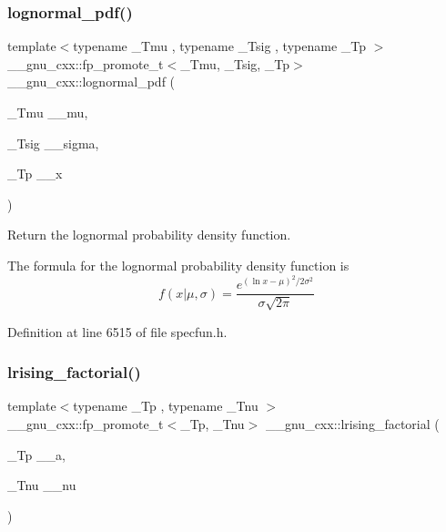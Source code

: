 \subsubsection{\texorpdfstring{lognormal\+\_\+pdf()}{lognormal\_pdf()}}
{\footnotesize\ttfamily template$<$typename \+\_\+\+Tmu , typename \+\_\+\+Tsig , typename \+\_\+\+Tp $>$ \\
\+\_\+\+\_\+gnu\+\_\+cxx\+::fp\+\_\+promote\+\_\+t$<$\+\_\+\+Tmu, \+\_\+\+Tsig, \+\_\+\+Tp$>$ \+\_\+\+\_\+gnu\+\_\+cxx\+::lognormal\+\_\+pdf (\begin{DoxyParamCaption}\item[{\+\_\+\+Tmu}]{\+\_\+\+\_\+mu,  }\item[{\+\_\+\+Tsig}]{\+\_\+\+\_\+sigma,  }\item[{\+\_\+\+Tp}]{\+\_\+\+\_\+x }\end{DoxyParamCaption})\hspace{0.3cm}{\ttfamily [inline]}}



Return the lognormal probability density function. 

The formula for the lognormal probability density function is \[ f(x|\mu,\sigma) = \frac{e^{(\ln{x}-\mu)^2/2\sigma^2}}{\sigma\sqrt{2\pi}} \] 

Definition at line 6515 of file specfun.\+h.

\mbox{\label{group__gnu__math__spec__func_ga8912b75b2f7592fb61128c766e7313b9}} 
\subsubsection{\texorpdfstring{lrising\+\_\+factorial()}{lrising\_factorial()}}
{\footnotesize\ttfamily template$<$typename \+\_\+\+Tp , typename \+\_\+\+Tnu $>$ \\
\+\_\+\+\_\+gnu\+\_\+cxx\+::fp\+\_\+promote\+\_\+t$<$\+\_\+\+Tp, \+\_\+\+Tnu$>$ \+\_\+\+\_\+gnu\+\_\+cxx\+::lrising\+\_\+factorial (\begin{DoxyParamCaption}\item[{\+\_\+\+Tp}]{\+\_\+\+\_\+a,  }\item[{\+\_\+\+Tnu}]{\+\_\+\+\_\+nu }\end{DoxyParamCaption})\hspace{0.3cm}{\ttfamily [inline]}}



